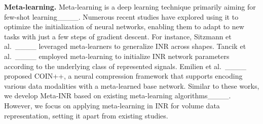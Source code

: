 {\bf Meta-learning.}
Meta-learning is a deep learning technique primarily aiming for few-shot learning____.
Numerous recent studies have explored using it to optimize the initialization of neural networks, enabling them to adapt to new tasks with just a few steps of gradient descent.
For instance, 
Sitzmann et al.\ ____ leveraged meta-learners to generalize INR across shapes.
Tancik et al.\ ____ employed meta-learning to initialize INR network parameters according to the underlying class of represented signals.
Emilien et al.\ ____ proposed COIN++, a neural compression framework that supports encoding various data modalities with a meta-learned base network.
Similar to these works, we develop Meta-INR based on existing meta-learning algorithms____.
However, we focus on applying meta-learning in INR for volume data representation, setting it apart from existing studies.